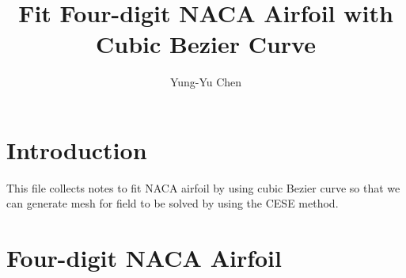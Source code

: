 \documentclass{turgon}
\title{
%
Fit Four-digit NACA Airfoil with Cubic Bezier Curve
%
}
\author{
%
Yung-Yu Chen
%
}
\begin{document}
\maketitle

\tableofcontents

\chapter*{Introduction}

This file collects notes to fit NACA airfoil by using cubic Bezier curve so
that we can generate mesh for field to be solved by using the CESE
method\cite{chang_method_1995}.

\chapter{Four-digit NACA Airfoil}

\end{document}
